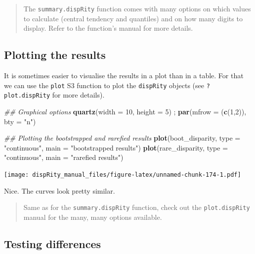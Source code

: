 \documentclass[]{book}
\newenvironment{Shaded}{\begin{snugshade}}{\end{snugshade}}
\newcommand{\CommentTok}[1]{\textcolor[rgb]{0.56,0.35,0.01}{\textit{#1}}}
\newcommand{\DataTypeTok}[1]{\textcolor[rgb]{0.13,0.29,0.53}{#1}}
\newcommand{\DecValTok}[1]{\textcolor[rgb]{0.00,0.00,0.81}{#1}}
\newcommand{\KeywordTok}[1]{\textcolor[rgb]{0.13,0.29,0.53}{\textbf{#1}}}
\newcommand{\NormalTok}[1]{#1}
\newcommand{\StringTok}[1]{\textcolor[rgb]{0.31,0.60,0.02}{#1}}
\begin{document}
\begin{quote}
The \texttt{summary.dispRity} function comes with many options on which values to calculate (central tendency and quantiles) and on how many digits to display. Refer to the function's manual for more details.
\end{quote}

\hypertarget{plotting-the-results}{%
\subsection{Plotting the results}\label{plotting-the-results}}

It is sometimes easier to visualise the results in a plot than in a table.
For that we can use the \texttt{plot} S3 function to plot the \texttt{dispRity} objects (see \texttt{?plot.dispRity} for more details).

\begin{Shaded}
\begin{Highlighting}[]
\CommentTok{## Graphical options}
\KeywordTok{quartz}\NormalTok{(}\DataTypeTok{width =} \DecValTok{10}\NormalTok{, }\DataTypeTok{height =} \DecValTok{5}\NormalTok{) ; }\KeywordTok{par}\NormalTok{(}\DataTypeTok{mfrow =}\NormalTok{ (}\KeywordTok{c}\NormalTok{(}\DecValTok{1}\NormalTok{,}\DecValTok{2}\NormalTok{)), }\DataTypeTok{bty =} \StringTok{"n"}\NormalTok{)}

\CommentTok{## Plotting the bootstrapped and rarefied results}
\KeywordTok{plot}\NormalTok{(boot_disparity, }\DataTypeTok{type =} \StringTok{"continuous"}\NormalTok{, }\DataTypeTok{main =} \StringTok{"bootstrapped results"}\NormalTok{)}
\KeywordTok{plot}\NormalTok{(rare_disparity, }\DataTypeTok{type =} \StringTok{"continuous"}\NormalTok{, }\DataTypeTok{main =} \StringTok{"rarefied results"}\NormalTok{)}
\end{Highlighting}
\end{Shaded}

\texttt{[image: dispRity\_manual\_files/figure-latex/unnamed-chunk-174-1.pdf]}

Nice. The curves look pretty similar.

\begin{quote}
Same as for the \texttt{summary.dispRity} function, check out the \texttt{plot.dispRity} manual for the many, many options available.
\end{quote}

\hypertarget{testing-differences}{%
\subsection{Testing differences}\label{testing-differences}}
\end{document}
